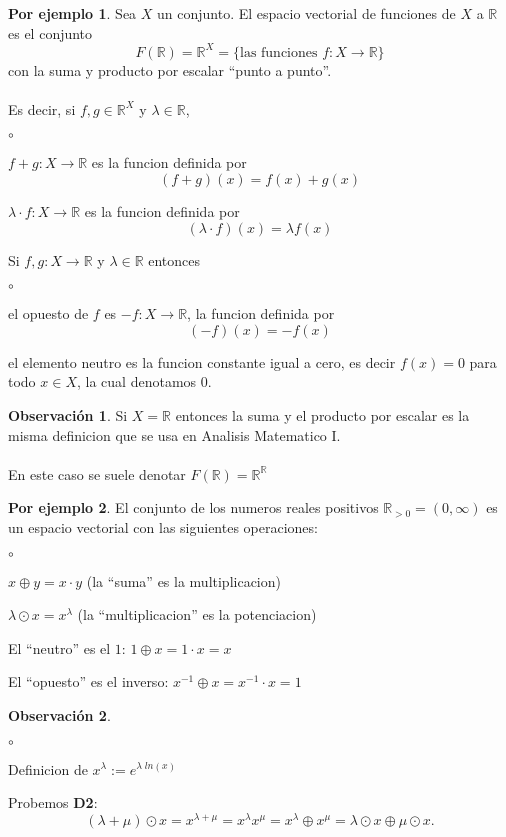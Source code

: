 \documentclass{article}
\theoremstyle{definition}
\theoremstyle{definition}
\newtheorem*{obs}{Observación}
\newtheorem*{ej}{Por ejemplo}
\theoremstyle{remark}
\begin{document}
\begin{ej}
  Sea $X$ un conjunto. El espacio vectorial de funciones de $X$ a $\mathbb{R}$ es el conjunto \[
    F(\mathbb{R})=\mathbb{R}^X=\{\text{las funciones } f : X \longrightarrow \mathbb{R}\}
  \]
  con la suma y producto por escalar ``punto a punto''.\\\\
  Es decir, si $f,g \in \mathbb{R}^X$ y $\lambda \in \mathbb{R}$, 
\begin{list}{$\circ$}{}  
\item $f+g:X \longrightarrow \mathbb{R}$ es la funcion definida por \[
    (f+g)(x)=f(x)+g(x)
  \]
\item $\lambda \cdot f : X \longrightarrow \mathbb{R}$ es la funcion definida por \[
    (\lambda \cdot f)(x)=\lambda f(x)
  \]
\end{list}
Si $f,g : X \longrightarrow \mathbb{R}$ y $\lambda \in \mathbb{R}$ entonces 
\begin{list}{$\circ$}{}  
\item el opuesto de $f$ es $-f: X \longrightarrow \mathbb{R}$, la funcion definida por \[
    (-f)(x)=-f(x)
  \]
\item el elemento neutro es la funcion constante igual a cero, es decir $f(x)=0$ para todo $ x \in X$, la cual denotamos $0$.
\end{list}
\end{ej}
\begin{obs}
  Si $X=\mathbb{R}$ entonces la suma y el producto por escalar es la misma definicion que se usa en Analisis Matematico I. \\\\ En este caso se suele denotar $F(\mathbb{R})=\mathbb{R}^\mathbb{R}$
\end{obs}
\begin{ej}
  El conjunto de los numeros reales positivos $\mathbb{R}_{>0}=(0,\infty)$ es un espacio vectorial con las siguientes operaciones: 
\begin{list}{$\circ$}{}  
\item $x \oplus y=x\cdot y$ (la ``suma'' es la multiplicacion) 
\item $\lambda \odot x = x^\lambda$ (la ``multiplicacion'' es la potenciacion)
\item El ``neutro'' es el $1$: $1 \oplus x  =1 \cdot x = x $ \item El ``opuesto'' es el inverso: $x^{-1} \oplus x = x^{-1}\cdot x = 1 $ 
\end{list}
\end{ej}
 \begin{obs}\;
   \begin{list}{$\circ$}{}  
   \item Definicion de $x^{\lambda} := e^{\lambda \; ln(x)}$
   \item Probemos \textbf{D2}: \[
       (\lambda + \mu ) \odot x = x^{\lambda + \mu } = x^\lambda  x^{\mu} = x^\lambda \oplus x^\mu = \lambda \odot x \oplus \mu \odot x .
     \]
   \end{list}
 \end{obs}
 \pagebreak
\end{document}
